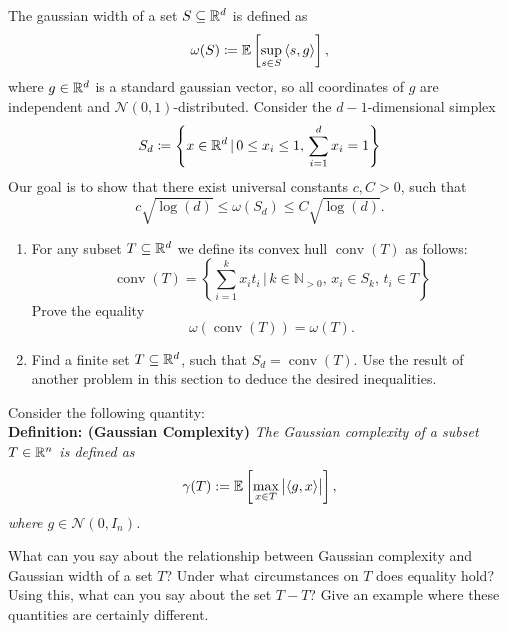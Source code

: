 \begin{myexercise}
    \label{prob:gaussian_width_simplex}
    The gaussian width of a set $S \subseteq \mathbb{R}^d$ is defined as
    $$ \omega(S) \coloneqq \mathbb{E} \left[ \sup_{s \in S} \, \langle s, g  \rangle \right],$$
    where $g \in \mathbb{R}^d$ is a standard gaussian vector, so all coordinates of $g$ are independent and $\mathcal{N}(0,1)$-distributed. Consider the $d-1$-dimensional simplex
    $$ S_d \coloneqq \left \{ x \in \mathbb{R}^d \, \vert \, 0\leq x_i \leq 1, \, \sum_{i=1}^d x_i = 1 \right \}$$
    Our goal is to show that there exist universal constants $c,C >0$, such that
    $$ c \sqrt{\log(d)} \leq \omega(S_d) \leq C \sqrt{\log(d)}.$$
    \begin{enumerate}
        \item[(a)] For any subset $T \subseteq \mathbb{R}^d$ we define its convex hull $\operatorname{conv}(T)$ as follows: 
        $$ \operatorname{conv}(T) = \left \{ \sum_{i=1}^k x_i t_i \, \vert \, k\in \mathbb{N}_{>0}, \, x_i \in S_k, \, t_i \in T \right \}$$
        Prove the equality
        $$ \omega(\operatorname{conv}(T)) = \omega(T).$$
        \item[(b)] Find a finite set $T \subseteq \mathbb{R}^d$, such that $S_d = \operatorname{conv}(T)$. Use the result of another problem in this section to deduce the desired inequalities.
    \end{enumerate}
\end{myexercise}

\begin{myexercise}
Consider the following quantity:\\
\textbf{Definition: (Gaussian Complexity)} {\em The Gaussian complexity of a subset $T \in \mathbb{R}^n$ is defined as
$$
\gamma(T) := \mathbb{E} \left[ \max_{x\in T} \big|\langle g, x\rangle \big|\right],
$$
where $g \in {\mathcal N}(0, I_n)$.}

What can you say about the relationship between Gaussian complexity and Gaussian width of a set $T$? Under what circumstances on $T$ does equality hold? Using this, what can you say
about the set $T-T$? Give an example where these quantities are certainly different.  
\end{myexercise}


